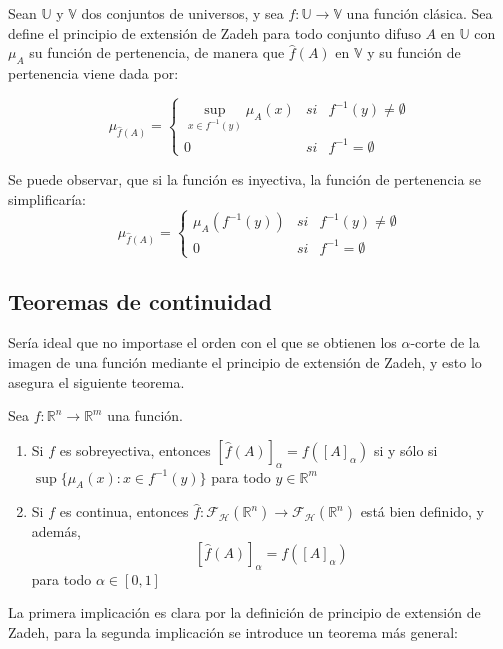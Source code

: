 \begin{definicion}
	Sean $\mathbb{U}$ y $\mathbb{V}$ dos conjuntos de universos, y sea $f: \mathbb{U} \longrightarrow \mathbb{V}$ una función clásica. Sea define el principio de extensión de Zadeh para todo conjunto difuso $A$ en $\mathbb{U}$ con $\mu_A$ su función de pertenencia, de manera que $\hat{f}(A)$ en $\mathbb{V}$ y su función de pertenencia viene dada por:
	
	$$
		\mu_{\hat{f}(A)}=\left\{
			\begin{array}{ccc}
				\sup_{x\in f^{-1}(y)} \mu_A(x) & si & f^{-1}(y)\neq\emptyset\\
				0 & si & f^{-1}=\emptyset
			\end{array}
		\right.
	$$
\end{definicion}


Se puede observar, que si la función es inyectiva, la función de pertenencia se simplificaría:
$$
	\mu_{\hat{f}(A)}=\left\{
		\begin{array}{ccc}
			\mu_A(f^{-1}(y)) & si & f^{-1}(y)\neq\emptyset\\
			0 & si & f^{-1}=\emptyset
		\end{array}
	\right.
$$

\subsection{Teoremas de continuidad}
Sería ideal que no importase el orden con el que se obtienen los $\alpha$-corte de la imagen de una función mediante el principio de extensión de Zadeh, y esto lo asegura el siguiente teorema.

\begin{teorema}
	Sea $f : \mathbb{R}^n \longrightarrow \mathbb{R}^m$ una función.
	\begin{enumerate}
		\item Si $f$ es sobreyectiva, entonces $[\hat{f}(A)]_\alpha = f([A]_\alpha)$ si y sólo si $\sup\{\mu_A(x) : x \in f^{-1}(y)\}$ para todo $y \in \mathbb{R}^m$
		\item Si $f$ es continua, entonces $\hat{f} : \mathcal{F}_\mathcal{H}(\mathbb{R}^n) \longrightarrow \mathcal{F}_\mathcal{H}(\mathbb{R}^n)$ está bien definido, y además,  
		$$[\hat{f}(A)]_\alpha = f([A]_\alpha)$$
		para todo $\alpha \in [0, 1]$
	\end{enumerate}
\end{teorema}

La primera implicación es clara por la definición de principio de extensión de Zadeh, para la segunda implicación se introduce un teorema más general:


